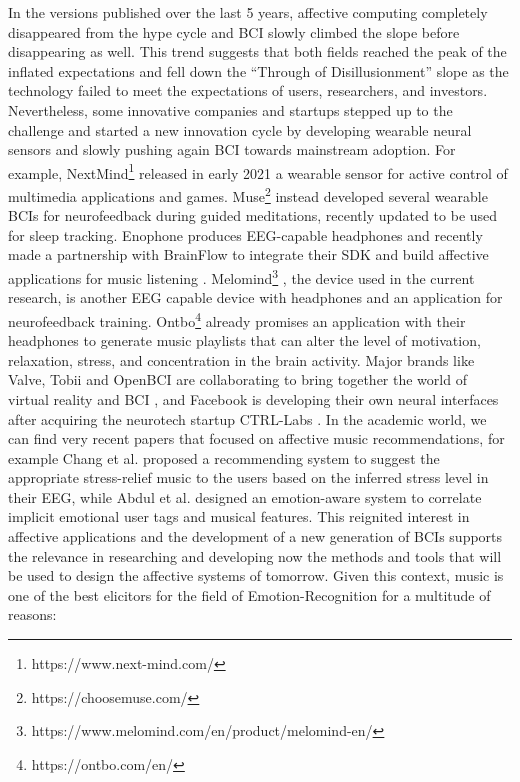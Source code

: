 In the versions published over the last 5 years, affective computing completely disappeared from the hype cycle and BCI slowly climbed the slope before disappearing as well. This trend suggests that both fields reached the peak of the inflated expectations and fell down the “Through of Disillusionment” slope as the technology failed to meet the expectations of users, researchers, and investors. Nevertheless, some innovative companies and startups stepped up to the challenge and started a new innovation cycle by developing wearable neural sensors and slowly pushing again BCI towards mainstream adoption. For example, NextMind\footnote{https://www.next-mind.com/}  released in early 2021 a wearable sensor for active control of multimedia applications and games. Muse\footnote{https://choosemuse.com/} instead developed several wearable BCIs for neurofeedback during guided meditations, recently updated to be used for sleep tracking. Enophone produces EEG-capable headphones and recently made a partnership with BrainFlow to integrate their SDK and build affective applications for music listening \cite{parfenov_brainflow_nodate}. Melomind\footnote{https://www.melomind.com/en/product/melomind-en/} , the device used in the current research, is another EEG capable device with headphones and an application for neurofeedback training. Ontbo\footnote{https://ontbo.com/en/} already promises an application with their headphones to generate music playlists that can alter the level of motivation, relaxation, stress, and concentration in the brain activity. Major brands like Valve, Tobii and OpenBCI are collaborating to bring together the world of virtual reality and BCI \cite{parfenov_openbci_nodate}, and Facebook is developing their own neural interfaces after acquiring the neurotech startup CTRL-Labs \cite{statt_facebook_2019}. In the academic world, we can find very recent papers that focused on affective music recommendations, for example Chang et al. \cite{chang_personalized_2017} proposed a recommending system to suggest the appropriate stress-relief music to the users based on the inferred stress level in their EEG, while Abdul et al. \cite{abdul_emotion-aware_2018} designed an emotion-aware system to correlate implicit emotional user tags and musical features. This reignited interest in affective applications and the development of a new generation of BCIs supports the relevance in researching and developing now the methods and tools that will be used to design the affective systems of tomorrow. Given this context, music is one of the best elicitors for the field of Emotion-Recognition for a multitude of reasons: 
